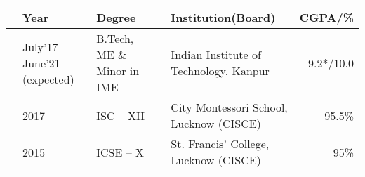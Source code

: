 
\newcommand{\education}[4]{
  & #1 & #2 & &#3 & #4
}
\begin{center}
\begin{tabular}{ | L{0.05cm} l | L{3cm} | L{0.05cm} C{7cm} | r |}
  \hline
  \education{\textbf{Year}}{\textbf{Degree}}{\textbf{Institution(Board)}}{\textbf{CGPA/\%}}\\
  \hline
  \education{July'17 -- June'21 (expected)}{B.Tech, ME \& Minor in IME}{Indian Institute of Technology, Kanpur}{9.2*/10.0}\\
  \education{2017}{ISC -- XII}{City Montessori School, Lucknow (CISCE)}{95.5\%}\\
  \education{2015}{ICSE -- X}{St. Francis' College, Lucknow (CISCE)}{95\%}\\
  \hline
\end{tabular}
\end{center}
\vspace{-4mm}

